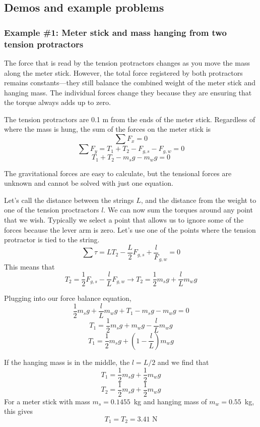 \subsection{Demos and example problems}
\subsubsection*{Example \#1: Meter stick and mass hanging from two tension protractors}
The force that is read by the tension protractors changes as you move the mass along the meter stick. However, the total force registered by both protractors remains constants---they still balance the combined weight of the meter stick and hanging mass. The individual forces change they because they are ensuring that the torque always adds up to zero.

\vspace{3cm}

The tension protractors are 0.1 m from the ends of the meter stick. Regardless of where the mass is hung, the sum of the forces on the meter stick is
$$\sum F_x = 0$$
$$\sum F_y = T_1 + T_2 - F_{g,s} - F_{g,w} = 0$$
$$T_1+T_2-m_sg-m_wg=0$$

The gravitational forces are easy to calculate, but the tensional forces are unknown and cannot be solved with just one equation.

Let's call the distance between the strings $L$, and the distance from the weight to one of the tension proctractors $l$. We can now sum the torques around any point that we wish. Typically we select a point that allows us to ignore some of the forces because the lever arm is zero. Let's use one of the points where the tension protractor is tied to the string.
$$\sum \tau = LT_2 - \frac{L}{2}F_{g,s} + \frac{l}F_{g,w} = 0$$
This means that
$$T_2=\frac{1}{2}F_{g,s}-\frac{l}{L}F_{g,w}\rightarrow \boxed{T_2=\frac{1}{2}m_sg+\frac{l}{L}m_wg}$$

Plugging into our force balance equation,
$$\frac{1}{2}m_sg+\frac{l}{L}m_wg  + T_1 - m_sg-m_wg=0$$
$$T_1 = \frac{1}{2}m_sg + m_wg - \frac{l}{L}m_wg$$
$$\boxed{T_1 = \frac{1}{2}m_sg + \left(1-\frac{l}{L}\right)m_wg}$$

If the hanging mass is in the middle, the $l=L/2$ and we find that
$$T_1 = \frac{1}{2}m_s g + \frac{1}{2}m_w g$$
$$T_2 = \frac{1}{2}m_s g + \frac{1}{2}m_w g$$
For a meter stick with mass $m_s=0.1455$~kg and hanging mass of $m_w=0.55$~kg, this gives
$$\boxed{T_1=T_2 = 3.41\mbox{ N}}$$

